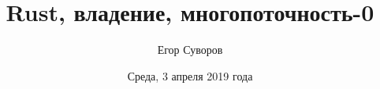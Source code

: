 \documentclass[utf8,xcolor=table]{beamer}
\title[Rust]{Rust, владение, многопоточность-0}
\author{Егор Суворов}
\institute[СПбГУ]{Курс <<Парадигмы и языки программирования>>, группа 18.Б09-пу}
\date[03.04.2019]{Среда, 3 апреля 2019 года}
\begin{document}
\begin{frame}
\titlepage
\end{frame}



\end{document}
